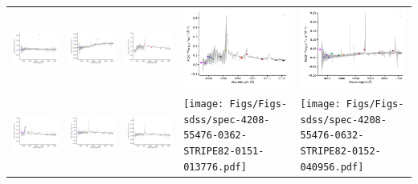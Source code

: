 \begin{center}
\begin{longtable}{l l l l l }
    \includegraphics[width=0.19\linewidth, clip]{Figs/Figs-sdss/spec-4037-55631-0460-SPLUS-n02s44-029163.pdf} & \includegraphics[width=0.19\linewidth, clip]{Figs/Figs-sdss/spec-4194-55450-0185-STRIPE82-0119-046591.pdf} & \includegraphics[width=0.19\linewidth, clip]{Figs/Figs-sdss/spec-4194-55450-0940-STRIPE82-0120-007072.pdf} & \includegraphics[width=0.19\linewidth, clip]{Figs/Figs-sdss/spec-4197-55479-0626-STRIPE82-0126-031903.pdf} & \includegraphics[width=0.19\linewidth, clip]{Figs/Figs-sdss/spec-4200-55499-0994-STRIPE82-0136-009636.pdf} \\
    \includegraphics[width=0.19\linewidth, clip]{Figs/Figs-sdss/spec-4202-55445-0409-SPLUS-s02s09-042917.pdf} & \includegraphics[width=0.19\linewidth, clip]{Figs/Figs-sdss/spec-4204-55470-0588-STRIPE82-0142-034401.pdf} & \includegraphics[width=0.19\linewidth, clip]{Figs/Figs-sdss/spec-4206-55471-0352-STRIPE82-0147-043690.pdf} & \texttt{[image: Figs/Figs-sdss/spec-4208-55476-0362-STRIPE82-0151-013776.pdf]} & \texttt{[image: Figs/Figs-sdss/spec-4208-55476-0632-STRIPE82-0152-040956.pdf]} \\

\end{longtable}
\end{center}
